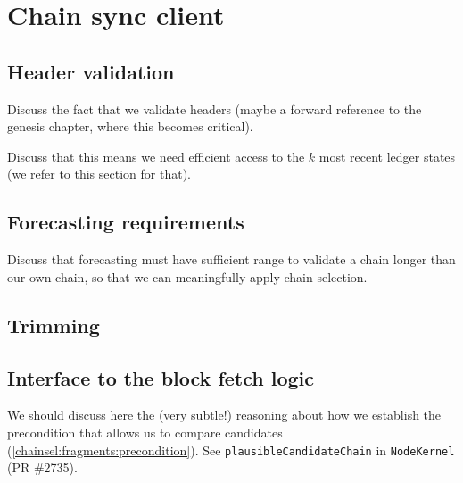 \chapter{Chain sync client}
\label{chainsyncclient}

\section{Header validation}
\label{chainsyncclient:validation}

Discuss the fact that we validate headers (maybe a forward reference to the genesis chapter, where this becomes critical).

Discuss that this means we need efficient access to the $k$ most recent ledger states (we refer to this section for that).

\section{Forecasting requirements}
\label{chainsyncclient:forecasting}

Discuss that forecasting must have sufficient range to validate a chain longer than our own chain, so that we can meaningfully apply chain selection.

\section{Trimming}
\label{chainsyncclient:trimming}

\section{Interface to the block fetch logic}
\label{chainsyncclient:plausiblecandidates}

We should discuss here the (very subtle!) reasoning about how we establish
the precondition that allows us to compare candidates
(\cref{chainsel:fragments:precondition}). See
\lstinline!plausibleCandidateChain! in \lstinline!NodeKernel!
(PR \#2735).
